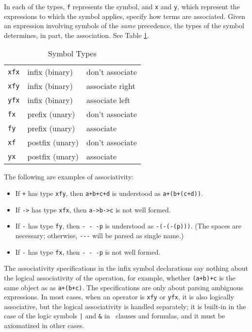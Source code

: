 \documentclass[11pt]{article}
\begin{document}
In each of the types, \verb:f: represents the
symbol, and \verb:x: and \verb:y:, which represent the expressions to
which the symbol applies, specify how terms are associated.
Given an expression involving symbols of the {\em same} precedence,
the types of the symbol determines, in part, the association.  See
Table \ref{op-types}.
\begin{table}[htbp] \centering
\caption{Symbol Types}  \label{op-types}
\begin{tabular}{lll}
\hline
\verb:xfx: & infix (binary) & don't associate \\
\verb:xfy: & infix (binary) & associate right \\
\verb:yfx: & infix (binary) & associate left \\
\verb:fx: & prefix (unary)  & don't associate \\
\verb:fy: & prefix (unary)  & associate \\
\verb:xf: & postfix (unary) & don't associate \\
\verb:yx: & postfix (unary) & associate \\
\hline
\end{tabular}
\end{table}
The following are examples of associativity:
\begin{itemize}
\item
If \verb:+: has type \verb:xfy:, then \verb:a+b+c+d: is understood as
\verb:a+(b+(c+d)):.
\item
If \verb:->: has type \verb:xfx:, then \verb:a->b->c: is not well formed.
\item
If \verb:-: has type \verb:fy:, then \verb:- - -p: is understood as
\verb:-(-(-(p))):.  (The spaces are necessary; otherwise, \verb:---: will
be parsed as single name.)
\item
If \verb:-: has type \verb:fx:, then \verb:- - -p: is not well formed.
\end{itemize}

 The associativity specifications in the
infix symbol declarations say nothing about the logical associativity
of the operation, for example, whether \verb:(a+b)+c: is the same object as
as \verb:a+(b+c):.  The specifications are only about parsing
ambiguous expressions.  In most cases, when an operator is \verb:xfy:
or \verb:yfx:, it is also logically associative, but the logical
associativity is handled separately; it is built-in in the case of the
logic symbols \verb:|: and \verb:&: in \otter\ clauses and formulas,
and it must be axiomatized in other cases.
\end{document}
